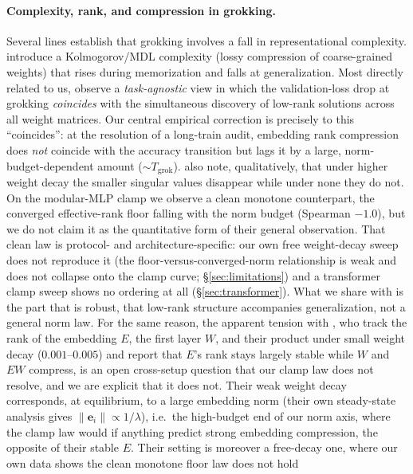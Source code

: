 \documentclass[11pt]{article}
\begin{document}
\paragraph{Complexity, rank, and compression in grokking.} Several lines establish that grokking
involves a fall in representational complexity. \citet{demoss2024complexity} introduce a Kolmogorov/MDL
complexity (lossy compression of coarse-grained weights) that rises during memorization and falls at
generalization. Most directly related to us, \citet{yunis2024spectral} observe a \emph{task-agnostic}
view in which the validation-loss drop at grokking \emph{coincides} with the simultaneous discovery of
low-rank solutions across all weight matrices. Our central empirical correction is precisely to this
``coincides'': at the resolution of a long-train audit, embedding rank compression does \emph{not}
coincide with the accuracy transition but lags it by a large, norm-budget-dependent amount
($\sim\!T_{\mathrm{grok}}$). \citet{yunis2024spectral} also note, qualitatively, that under higher weight
decay the smaller singular values disappear while under none they do not. On the modular-MLP clamp we
observe a clean monotone counterpart, the converged effective-rank floor falling with the norm budget
(Spearman $-1.0$), but we do not claim it as the quantitative form of their general observation. That
clean law is protocol- and architecture-specific: our own free weight-decay sweep does not reproduce it
(the floor-versus-converged-norm relationship is weak and does not collapse onto the clamp curve;
\S\ref{sec:limitations}) and a transformer clamp sweep shows no ordering at all
(\S\ref{sec:transformer}). What we share with \citet{yunis2024spectral} is the part that is robust, that
low-rank structure accompanies generalization, not a general norm law. For the same reason, the
apparent tension with \citet{alquabeh2025embedding}, who track the rank of the embedding $E$, the first
layer $W$, and their product under small weight decay ($0.001$--$0.005$) and report that $E$'s rank stays
largely stable while $W$ and $EW$ compress, is an open cross-setup question that our clamp law does not
resolve, and we are explicit that it does not. Their weak weight decay corresponds, at equilibrium, to
a large embedding norm (their own steady-state analysis gives $\lVert\mathbf{e}_i\rVert\propto
1/\lambda$), i.e.\ the high-budget end of our norm axis, where the clamp law would if anything predict
strong embedding compression, the opposite of their stable $E$. Their setting is moreover a
free-decay one, where our own data shows the clean monotone floor law does not hold
\end{document}
